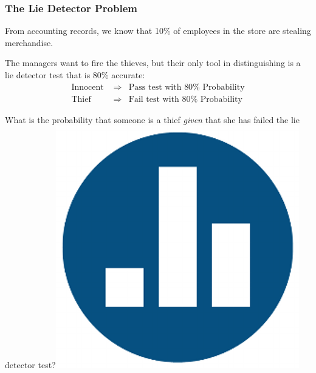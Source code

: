 \documentclass[handout]{beamer}
\begin{document}
\begin{frame}
\frametitle{The Lie Detector Problem}
\begin{block}{From accounting records, we know that 10\% of employees in the store are stealing merchandise.}\end{block}
\begin{block}{The managers want to fire the thieves, but their only tool in distinguishing is a lie detector test that is 80\% accurate:}
	\begin{eqnarray*}
	\mbox{Innocent } &\Rightarrow& \mbox{Pass test with } 80\% \mbox{ Probability}\\
	\mbox{Thief } &\Rightarrow& \mbox{Fail test with } 80\% \mbox{ Probability}
	\end{eqnarray*}
\end{block}

\pause
\vspace{0.2in}
\begin{alertblock}{What is the probability that someone is a thief \emph{given} that she has failed the lie detector test?\hfill\includegraphics[scale = 0.03]{./images/clicker} }
\end{alertblock}

\end{frame}
\end{document}
